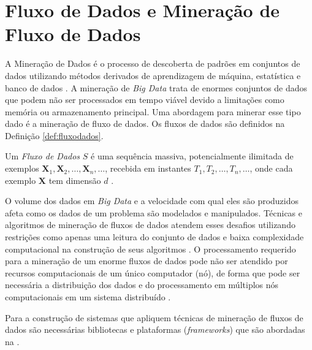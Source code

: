 
\section{Fluxo de Dados e Mineração de Fluxo de Dados}

A Mineração de Dados é o processo de descoberta de padrões em conjuntos de dados
utilizando métodos derivados de aprendizagem de máquina, estatística e banco de
dados \cite{Gaber2005}. A mineração de \emph{Big Data} trata de enormes
conjuntos de dados que podem não ser processados em tempo viável devido a
limitações como memória ou armazenamento principal. Uma abordagem para minerar
esse tipo dado é a mineração de fluxo de dados. Os fluxos de dados são definidos
na Definição \ref{def:fluxodados}.

\begin{definition}
  Um \textit{Fluxo de Dados} $S$ é uma sequência massiva, potencialmente
  ilimitada de exemplos $\mathbf{X}_1, \mathbf{X}_2, \dots, \mathbf{X}_n, \dots$,
  recebida em instantes $T_1, T_2, \dots, T_n, \dots$,
  onde cada exemplo $\mathbf{X}$ tem dimensão $d$
  \cite{Aggarwal2003}.
  \label{def:fluxodados}
\end{definition}

O volume dos dados em \emph{Big Data} e a velocidade com qual eles são
produzidos afeta como os dados de um problema são modelados e manipulados.
Técnicas e algoritmos de mineração de fluxos de dados atendem esses desafios
utilizando restrições como apenas uma leitura do conjunto de dados e baixa
complexidade computacional na construção de seus algoritmos
\cite{Gama2007,Gaber2005}.
O processamento requerido para a mineração de um enorme fluxos de dados pode não
ser atendido por recursos computacionais de um único computador (nó), de forma
que pode ser necessária a distribuição dos dados e do processamento em múltiplos
nós computacionais em um sistema distribuído \cite{Gaber2005}.


Para a construção de sistemas que apliquem técnicas de mineração de fluxos de
dados são necessárias bibliotecas e plataformas (\emph{frameworks})
que são abordadas na .

